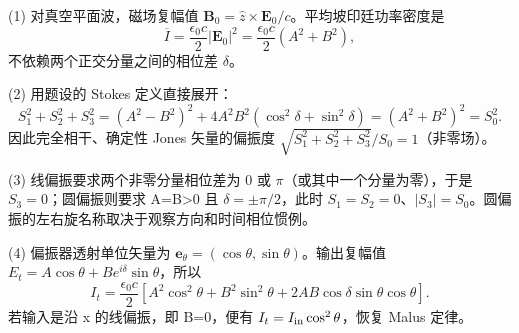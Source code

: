 (1) 对真空平面波，磁场复幅值 \(\boldsymbol B_0=\hat z\times\boldsymbol E_0/c\)。平均坡印廷功率密度是
\[
\overline I=\frac{\epsilon_0c}{2}|\boldsymbol E_0|^2
=\frac{\epsilon_0c}{2}(A^2+B^2),
\]
不依赖两个正交分量之间的相位差 \(\delta \)。

(2) 用题设的 Stokes 定义直接展开：
\[
S_1^2+S_2^2+S_3^2
=(A^2-B^2)^2+4A^2B^2(\cos^2\delta+\sin^2\delta)
=(A^2+B^2)^2=S_0^2.
\]
因此完全相干、确定性 Jones 矢量的偏振度 \(\sqrt{S_1^2+S_2^2+S_3^2}/S_0=1\)（非零场）。

(3) 线偏振要求两个非零分量相位差为 0 或 \(\pi \)（或其中一个分量为零），于是 \(S_3=0\)；圆偏振则要求 A=B>0 且 \(\delta=\pm\pi/2\)，此时 \(S_1=S_2=0\)、\(|S_3|=S_0\)。圆偏振的左右旋名称取决于观察方向和时间相位惯例。

(4) 偏振器透射单位矢量为 \(\boldsymbol e_\theta=(\cos\theta,\sin\theta)\)。输出复幅值 \(E_t=A\cos\theta+B e^{i\delta}\sin\theta\)，所以
\[
I_t=\frac{\epsilon_0c}{2}\left[
A^2\cos^2\theta+B^2\sin^2\theta+2AB\cos\delta\sin\theta\cos\theta\right].
\]
若输入是沿 x 的线偏振，即 B=0，便有 \(I_t=I_{\rm in}\cos^2\theta\)，恢复 Malus 定律。
